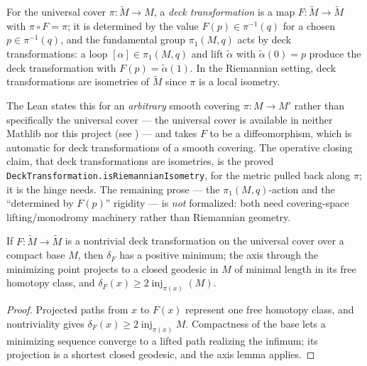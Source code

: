 \begin{definition}
  \label{def:pet-ch6-deck-transformation}
  \leanok
  For the universal cover $\pi:\tilde M\to M$, a \emph{deck transformation} is
  a map $F:\tilde M\to\tilde M$ with $\pi\circ F=\pi$; it is determined by the
  value $F(p)\in\pi^{-1}(q)$ for a chosen $p\in\pi^{-1}(q)$, and the
  fundamental group $\pi_1(M,q)$ acts by deck transformations: a loop
  $[\alpha]\in\pi_1(M,q)$ and lift $\tilde\alpha$ with
  $\tilde\alpha(0)=p$ produce the deck transformation with
  $F(p)=\tilde\alpha(1)$. In the Riemannian setting, deck transformations are
  isometries of $\tilde M$ since $\pi$ is a local isometry.

  The Lean states this for an \emph{arbitrary} smooth covering $\pi:M\to M'$
  rather than specifically the universal cover --- the universal cover is
  available in neither Mathlib nor this project (see
  ) --- and takes $F$ to be a diffeomorphism,
  which is automatic for deck transformations of a smooth covering. The
  operative closing claim, that deck transformations are isometries, is the
  proved \texttt{DeckTransformation.isRiemannianIsometry}, for the metric
  pulled back along $\pi$; it is the hinge 
  needs. The remaining prose --- the $\pi_1(M,q)$-action and the ``determined by
  $F(p)$'' rigidity --- is \emph{not} formalized: both need covering-space
  lifting/monodromy machinery rather than Riemannian geometry.
\end{definition}

\begin{lemma}
  \label{lem:pet-ch6-deck-transformation-dilation}
  If $F:\tilde M\to\tilde M$ is a nontrivial deck transformation on the
  universal cover over a compact base $M$, then $\delta_F$ has a positive
  minimum; the axis through the minimizing point projects to a closed
  geodesic in $M$ of minimal length in its free homotopy class, and
  $\delta_F(x)\ge2\operatorname{inj}_{\pi(x)}(M)$.
\end{lemma}
\begin{proof}
  \sketch
  Projected paths from \(x\) to \(F(x)\) represent one free homotopy class, and nontriviality gives \(\delta_F(x)\ge2\operatorname{inj}_{\pi(x)}M\). Compactness of the base lets a minimizing sequence converge to a lifted path realizing the infimum; its projection is a shortest closed geodesic, and the axis lemma applies.
\end{proof}

